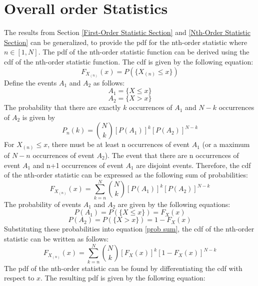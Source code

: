 \documentclass[conference]{IEEEtran}
\begin{document}
\section{Overall order Statistics}
The results from Section \ref{First-Order Statistic Section} and \ref{Nth-Order Statistic Section} can be generalized, to provide the pdf for the nth-order statistic where $n\in[1,N]$. The pdf of the nth-order statistic function can be derived using the cdf of the nth-order statistic function. The cdf is given by the following equation:
\begin{equation}
F_{X_{(n)}}(x) = P(\{X_{(n)} \leq x\})
\end{equation}
Define the events $A_1$ and $A_2$ as follows:
\begin{equation}
A_1 = \{X \leq x\}
\end{equation}
\begin{equation}
A_2 = \{X > x\}
\end{equation}
The probability that there are exactly $k$ occurrences of $A_1$ and $N-k$ occurrences of $A_2$ is given by
\begin{equation}
P_n(k) = \binom{N}{k}[P(A_1)]^k[P(A_2)]^{N-k}
\end{equation}
For $X_{(n)} \leq x$, there must be at least n occurrences of event $A_1$ (or a maximum of $N-n$ occurrences of event $A_2$). The event that there are n occurrences of event $A_1$ and n+1 occurrences of event $A_1$ are disjoint events. Therefore,  the cdf of the nth-order statistic can be expressed as the following sum of probabilities:
\begin{equation}
\label{prob sum}
F_{X_{(n)}}(x) = \sum_{k=n}^{N}\binom{N}{k}[P(A_1)]^k[P(A_2)]^{N-k}
\end{equation}
The probability of events $A_1$ and $A_2$ are given by the following equations:
\begin{equation}
P(A_1) = P(\{X \leq x\}) = F_X(x)
\end{equation}
\begin{equation}
P(A_2) = P(\{X > x\}) = 1 - F_X(x)
\end{equation}
Substituting these probabilities into equation \eqref{prob sum}, the cdf of the nth-order statistic can be written as follows:
\begin{equation}
F_{X_{(n)}}(x) = \sum_{k=n}^{N}\binom{N}{k}[F_X(x)]^k[1-F_X(x)]^{N-k}
\end{equation}
The pdf of the nth-order statistic can be found by differentiating the cdf with respect to $x$. The resulting pdf is given by the following equation:
\end{document}

